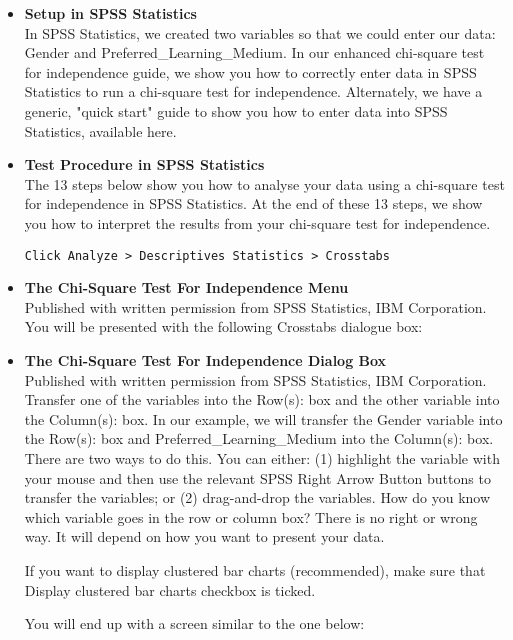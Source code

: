 \documentclass[00-IntroStatsMaster.tex]{subfiles}
\begin{document}
\begin{itemize}
\item \textbf{Setup in SPSS Statistics} \\
In SPSS Statistics, we created two variables so that we could enter our data: Gender and Preferred\_Learning\_Medium. In our enhanced chi-square test for independence guide, we show you how to correctly enter data in SPSS Statistics to run a chi-square test for independence. Alternately, we have a generic, "quick start" guide to show you how to enter data into SPSS Statistics, available here.

\item \textbf{Test Procedure in SPSS Statistics} \\
The 13 steps below show you how to analyse your data using a chi-square test for independence in SPSS Statistics. At the end of these 13 steps, we show you how to interpret the results from your chi-square test for independence.

\begin{verbatim}
Click Analyze > Descriptives Statistics > Crosstabs
\end{verbatim}

\item \textbf{The Chi-Square Test For Independence Menu} \\
Published with written permission from SPSS Statistics, IBM Corporation.
You will be presented with the following Crosstabs dialogue box:

\item \textbf{The Chi-Square Test For Independence Dialog Box} \\
Published with written permission from SPSS Statistics, IBM Corporation.
Transfer one of the variables into the Row(s): box and the other variable into the Column(s): box. In our example, we will transfer the Gender variable into the Row(s): box and Preferred\_Learning\_Medium into the Column(s): box. There are two ways to do this. You can either: (1) highlight the variable with your mouse and then use the relevant SPSS Right Arrow Button buttons to transfer the variables; or (2) drag-and-drop the variables. How do you know which variable goes in the row or column box? There is no right or wrong way. It will depend on how you want to present your data.

If you want to display clustered bar charts (recommended), make sure that Display clustered bar charts checkbox is ticked.

You will end up with a screen similar to the one below:


\end{itemize}
\end{document}
